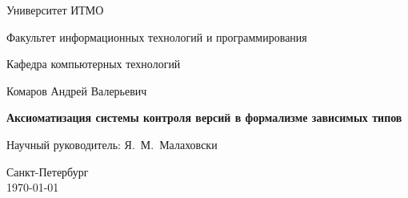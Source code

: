 \documentclass[a4paper]{report}
\theoremstyle{plain}
\theoremstyle{definition}
\begin{document}
\pagestyle{title}

\begin{center}
  Университет ИТМО \\
  \hrulefill
 
\vspace{2cm}

Факультет информационных технологий и программирования

Кафедра компьютерных технологий

\vspace{3cm}

{\Large Комаров Андрей Валерьевич}

\vspace{2cm}

\vbox{\LARGE\bfseries Аксиоматизация системы контроля версий в
  формализме зависимых типов }

\vspace{4cm}

{\Large Научный руководитель: Я.~М.~Малаховски}

\vspace{6cm}

Санкт-Петербург\\ \today
\end{center}


\newpage
\setcounter{page}{3}
\pagestyle{plain}

\tableofcontents

\startthechapters





\printbibliography

\begin{appendices}
  \renewcommand{\thechapter}{\arabic{chapter}}
 \renewcommand{\chaptername}{Приложение}
  
\end{appendices}
\end{document}
